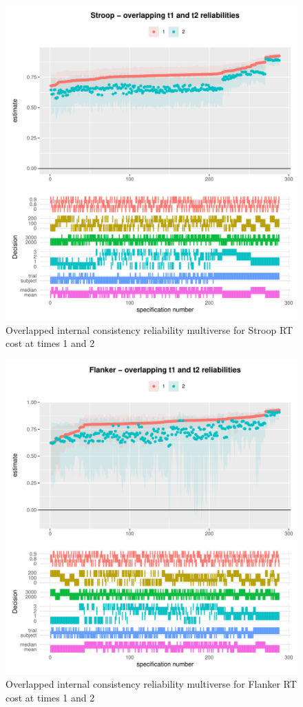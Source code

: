 \documentclass[
  english,
  man,floatsintext]{apa6}
\begin{document}
\begin{figure}
\centering
\includegraphics{Reliability_Multiverse_files/figure-latex/unnamed-chunk-11-1.pdf}
\caption{\label{fig:unnamed-chunk-11}Overlapped internal consistency reliability multiverse for Stroop RT cost at times 1 and 2}
\end{figure}

\begin{figure}
\centering
\includegraphics{Reliability_Multiverse_files/figure-latex/unnamed-chunk-12-1.pdf}
\caption{\label{fig:unnamed-chunk-12}Overlapped internal consistency reliability multiverse for Flanker RT cost at times 1 and 2}
\end{figure}
\end{document}
